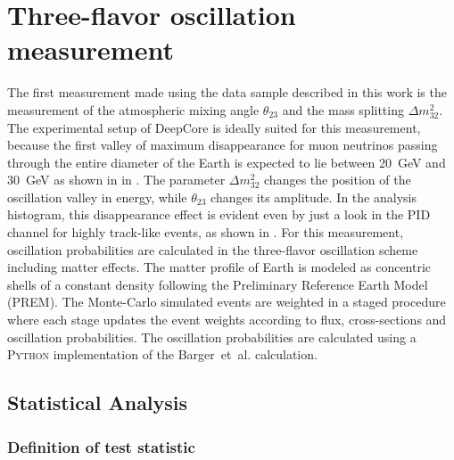 \chapter{Three-flavor oscillation measurement}
\setchapterpreamble[u]{\margintoc}

The first measurement made using the data sample described in this work is the measurement of the atmospheric mixing angle $\theta_{23}$ and the mass splitting $\Delta m^2_{32}$. The experimental setup of DeepCore is ideally suited for this measurement, because the first valley of maximum disappearance for muon neutrinos passing through the entire diameter of the Earth is expected to lie between 20~GeV and 30~GeV as shown in  in . The parameter $\Delta m^2_{32}$ changes the position of the oscillation valley in energy, while $\theta_{23}$ changes its amplitude. In the analysis histogram, this disappearance effect is evident even by just a look in the PID channel for highly track-like events, as shown in . For this measurement, oscillation probabilities are calculated in the three-flavor oscillation scheme including matter effects. The matter profile of Earth is modeled as concentric shells of a constant density following the Preliminary Reference Earth Model (PREM). The Monte-Carlo simulated events are weighted in a staged procedure where each stage updates the event weights according to flux, cross-sections and oscillation probabilities. The oscillation probabilities are calculated using a \textsc{Python} implementation of the Barger~et~al. calculation.

%    

\section{Statistical Analysis}

\subsection{Definition of test statistic}
\label{sec:test-statistic}

